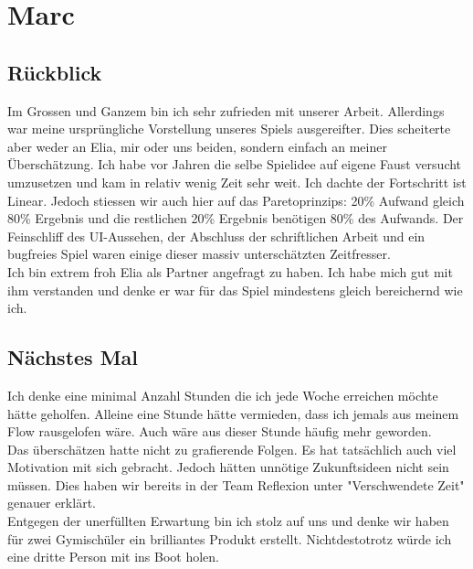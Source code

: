 \chapter{Marc}

\section{Rückblick}
Im Grossen und Ganzem bin ich sehr zufrieden mit unserer Arbeit.
Allerdings war meine ursprüngliche Vorstellung unseres Spiels ausgereifter.
Dies scheiterte aber weder an Elia, mir oder uns beiden, sondern einfach an meiner Überschätzung.
Ich habe vor Jahren die selbe Spielidee auf eigene Faust versucht umzusetzen und kam in relativ wenig Zeit sehr weit.
Ich dachte der Fortschritt ist Linear.
Jedoch stiessen wir auch hier auf das Paretoprinzips: 20\% Aufwand gleich 80\% Ergebnis und die restlichen 20\% Ergebnis benötigen 80\% des Aufwands.
Der Feinschliff des UI-Aussehen, der Abschluss der schriftlichen Arbeit und ein bugfreies Spiel waren einige dieser massiv unterschätzten Zeitfresser. \\
Ich bin extrem froh Elia als Partner angefragt zu haben.
Ich habe mich gut mit ihm verstanden und denke er war für das Spiel mindestens gleich bereichernd wie ich.

\section{Nächstes Mal}
Ich denke eine minimal Anzahl Stunden die ich jede Woche erreichen möchte hätte geholfen.
Alleine eine Stunde hätte vermieden, dass ich jemals aus meinem Flow rausgelofen wäre.
Auch wäre aus dieser Stunde häufig mehr geworden. \\
Das überschätzen hatte nicht zu grafierende Folgen.
Es hat tatsächlich auch viel Motivation mit sich gebracht.
Jedoch hätten unnötige Zukunftsideen nicht sein müssen.
Dies haben wir bereits in der Team Reflexion unter "Verschwendete Zeit" genauer erklärt. \\
Entgegen der unerfüllten Erwartung bin ich stolz auf uns und denke wir haben für zwei Gymischüler ein brilliantes Produkt erstellt.
Nichtdestotrotz würde ich eine dritte Person mit ins Boot holen.
